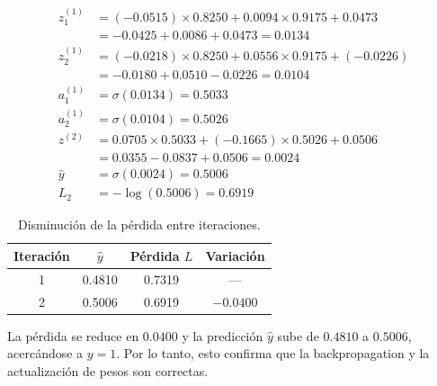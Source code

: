 \documentclass{article}
\begin{document}
\begin{align*}
  z^{(1)}_1 &= (-0.0515) \times 0.8250 + 0.0094 \times 0.9175 + 0.0473 \\
             &= -0.0425 + 0.0086 + 0.0473 = \mathbf{0.0134} \\[6pt]
  z^{(1)}_2 &= (-0.0218) \times 0.8250 + 0.0556 \times 0.9175 + (-0.0226) \\
             &= -0.0180 + 0.0510 - 0.0226 = \mathbf{0.0104} \\[6pt]
  a^{(1)}_1 &= \sigma(0.0134) = \mathbf{0.5033} \\
  a^{(1)}_2 &= \sigma(0.0104) = \mathbf{0.5026} \\[6pt]
  z^{(2)}   &= 0.0705 \times 0.5033 + (-0.1665) \times 0.5026 + 0.0506 \\
             &= 0.0355 - 0.0837 + 0.0506 = \mathbf{0.0024} \\[6pt]
  \hat{y}   &= \sigma(0.0024) = \mathbf{0.5006} \\[6pt]
  L_2       &= -\log(0.5006) = \mathbf{0.6919}
\end{align*}
 
\begin{table}[H]
  \centering
  \begin{tabular}{cccc}
    \toprule
    \textbf{Iteración} & $\hat{y}$ & \textbf{Pérdida $L$} & \textbf{Variación} \\
    \midrule
    1 & 0.4810 & 0.7319 & --- \\
    2 & 0.5006 & 0.6919 & $-0.0400$ \\
    \bottomrule
  \end{tabular}
  \caption{Disminución de la pérdida entre iteraciones.}
\end{table}
 
La pérdida se reduce en $0.0400$ y la predicción $\hat{y}$ sube de $0.4810$ a $0.5006$, acercándose a $y = 1$. Por lo tanto, esto confirma que la backpropagation y la actualización de pesos son correctas.
\end{document}

